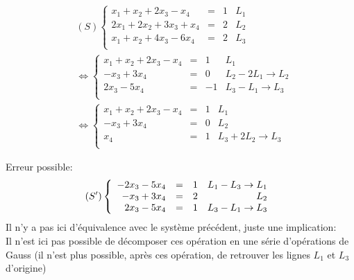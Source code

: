 \documentclass[../main.tex]{subfile}
\begin{document}
\begin{ex}
$$
\begin{aligned}
	&(S)\left\{
	\begin{array}{rclr}
		x_1 + x_2 + 2x_3 - x_4 &=& 1 & L_1\\
		2x_1 + 2x_2 + 3x_3 + x_4 &=& 2 & L_2\\
		x_1 + x_2 + 4x_3 - 6x_4 &=& 2 & L_3\\
	\end{array}
	\right.\\
	&\Leftrightarrow \left\{
	\begin{array}{rclr}
		x_1 + x_2 + 2x_3 - x_4 &=& 1 & L_1\\
		- x_3 + 3x_4 &=& 0 & L_2 - 2L_1 \to L_2\\
		2x_3 - 5x_4 &=& -1 & L_3 - L_1 \to L_3\\
	\end{array}
	\right.\\
	&\Leftrightarrow \left\{
	\begin{array}{rclr}
		x_1 + x_2 + 2x_3 - x_4 &=& 1 & L_1\\
		- x_3 + 3x_4 &=& 0 & L_2\\
		x_4 &=& 1 & L_3 + 2L_2 \to L_3\\
	\end{array}
	\right.
\end{aligned}
$$
\begin{rema}
	Erreur possible:\\
	$$
	(S') \left\{
	\begin{array}{rclr}
		-2x_3 - 5x_4 &=& 1 & L_1 - L_3 \to L_1\\
		- x_3 + 3x_4 &=& 2 & L_2\\
		2x_3 - 5x_4 &=& 1 & L_3 - L_1 \to L_3\\
	\end{array}
	\right.\\
	$$
	Il n'y a pas ici d'équivalence avec le système précédent, juste une implication:\\
	Il n'est ici pas possible de décomposer ces opération en une série d'opérations de Gauss 
	(il n'est plus possible, après ces opération, de retrouver les lignes $L_1$ et $L_3$ d'origine)
\end{rema}
	
\end{ex}
\end{document}
